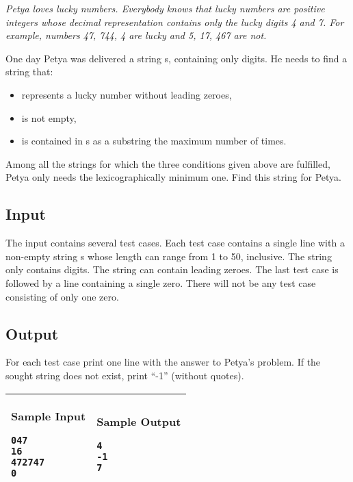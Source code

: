 \textit{Petya loves lucky numbers. Everybody knows that lucky numbers are
positive integers whose decimal representation contains only the lucky
digits 4 and 7. For example, numbers 47, 744, 4 are lucky and 5, 17, 467 are
not.}

One day Petya was delivered a string s, containing only digits. He needs to
find a string that:
\begin{itemize}
\item represents a lucky number without leading zeroes,
\item is not empty,
\item is contained in s as a substring the maximum number of times.
\end{itemize}
Among all the strings for which the three conditions given above are
fulfilled, Petya only needs the lexicographically minimum one. Find this
string for Petya.

\subsection*{Input}

The input contains several test cases. Each test case contains a single line
with a non-empty string s whose length can range from 1 to 50, inclusive.
The string only contains digits. The string can contain leading zeroes.  The
last test case is followed by a line containing a single zero. There will
not be any test case consisting of only one zero.

\subsection*{Output}

For each test case print one line with the answer to Petya’s problem. If the
sought string does not exist, print ``-1'' (without quotes).

\begin{table}[!h]
\centering
\begin{tabular}{|l|l|}
\hline
\begin{minipage}[t]{3in}
\textbf{Sample Input}
\begin{verbatim}
047
16
472747
0
\end{verbatim}
\vspace{1mm}
\end{minipage}
&

\begin{minipage}[t]{3in}
\textbf{Sample Output}
\begin{verbatim}
4
-1
7
\end{verbatim}
\vspace{1mm}
\end{minipage} \\
\hline
\end{tabular}
\end{table}

